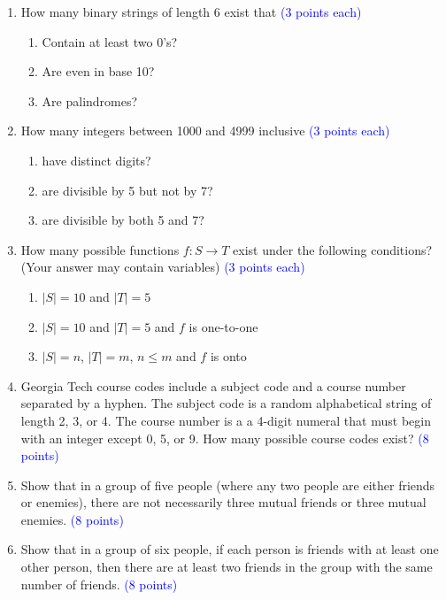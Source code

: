\documentclass{article}
\newcommand{\pt}[1]{\textcolor{blue}{(#1 points)}}
\newcommand{\pte}[1]{\textcolor{blue}{(#1 points each)}}
\begin{document}
\begin{enumerate}

\item How many binary strings of length 6 exist that \pte{3}
\begin{enumerate}
    \item Contain at least two 0's?
    \item Are even in base 10?
    \item Are palindromes?
\end{enumerate}

\item How many integers between 1000 and 4999 inclusive \pte{3}
\begin{enumerate}
    \item have distinct digits?
    \item are divisible by 5 but not by 7?
    \item are divisible by both 5 and 7?
\end{enumerate}

\item How many possible functions $f:S \rightarrow T$ exist under the following conditions? (Your answer may contain variables) \pte{3}
\begin{enumerate}
    \item $|S|=10$ and $|T|=5$
    \item $|S|=10$ and $|T|=5$ and $f$ is one-to-one
    \item $|S|=n$, $|T|=m$, $n \leq m$ and $f$ is onto 
\end{enumerate}

\item Georgia Tech course codes include a subject code and a course number separated by a hyphen. The subject code is a random alphabetical string of length 2, 3, or 4. The course number is a a 4-digit numeral that must begin with an integer except 0, 5, or 9. How many possible course codes exist? \pt{8}

\item Show that in a group of five people (where any two people are either friends or enemies), there are not necessarily three mutual friends or three mutual enemies. \pt{8}

\item Show that in a group of six people, if each person is friends with at least one other person, then there are at least two friends in the group with the same number of friends. \pt{8}



\end{enumerate}
\end{document}
